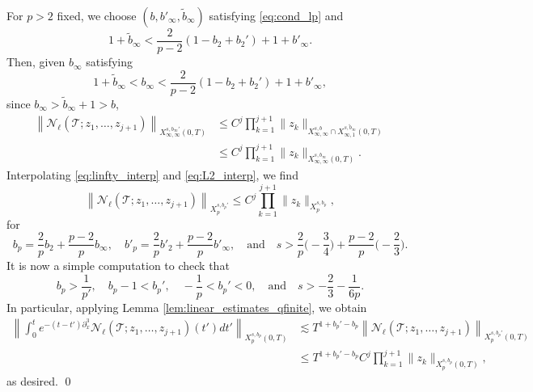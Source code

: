 \documentclass[a4paper,
11pt,  reqno]{amsart}
\newcommand{\5}{\textup{V}}
\newcommand{\wt}{\widetilde}
\newcommand{\dx}{\partial_x}
\theoremstyle{remark}
\newcommand{\TT}{\mathcal{T}}
\renewcommand{\l}{\ell}
\numberwithin{equation}{section}
\numberwithin{theorem}{section}
\newcommand{\Ncal}{\mathcal{N}}
\begin{document}
For $p>2$ fixed, we choose $(b, b'_\infty, \wt{b}_\infty)$ satisfying \eqref{eq:cond_lp} and
\begin{equation}
    1+\wt{b}_\infty <\frac{2}{p-2}(1-b_2+b_2') + 1 + b'_\infty.
\end{equation}
Then, given $b_\infty$ satisfying
\begin{equation}
    1+\wt{b}_\infty<b_\infty <\frac{2}{p-2}(1-b_2+b_2') + 1 + b'_\infty,
\end{equation}
since $b_\infty>\wt{b}_\infty+1>b$,
\begin{align}
    \left\| \Ncal_\l(\TT; z_1,\dots, z_{j+1})\right\|_{X^{s,b_\infty'}_{\infty, \infty}(0,T)} &\le  C^j\prod_{k=1}^{j+1}\|z_k\|_{X^{s,b}_{\infty, \infty}\cap X^{s,\wt{b}_\infty}_{\infty,1}(0,T)}\\&\le  C^j\prod_{k=1}^{j+1}\|z_k\|_{X^{s,b_\infty}_{\infty, \infty}(0,T)}.\label{eq:linfty_interp}
\end{align}
Interpolating \eqref{eq:linfty_interp} and \eqref{eq:L2_interp}, we find
\begin{equation}\label{eq:Lp_interp}
		\left\| \Ncal_\l(\TT; z_1,\dots, z_{j+1})\right\|_{X^{s,b_p'}_{p}}  \le  C^j\prod_{k=1}^{j+1}\|z_k\|_{X^{s,b_p}_{p}},
\end{equation}
for
$$
b_p=\frac{2}{p}b_2+\frac{p-2}{p}b_\infty,
\quad 
b'_p=\frac{2}{p}b'_2+\frac{p-2}{p}b'_\infty, 
\quad 
\text{and}
\quad 
s> \frac2p \Big(-\frac34\Big) + \frac{p-2}{p} \Big(-\frac23\Big)
.
$$
It is now a simple computation to check that
$$
b_p>\frac1{p'},
\quad b_p-1<b_p',
\quad 
-\frac{1}{p}<b_p'<0,
\quad 
\text{and}
\quad 
s> -\frac23 - \frac{1}{6p}.
$$
In particular, applying Lemma \ref{lem:linear_estimates_qfinite}, we obtain
	\begin{align}
		\left\|\int_0^t e^{-(t-t')\dx^3} \Ncal_\l(\TT; z_1,\dots, z_{j+1})(t') dt'  \right\|_{X^{s,b_p}_{p}(0,T)} 
        &	\lesssim T^{1+b_p'-b_p}\left\|\Ncal_\l(\TT; z_1,\dots, z_{j+1})  \right\|_{X^{s,b_p'}_{p} (0,T)} 
        \\
        &\le T^{1+b_p'-b_p} C^j\prod_{k=1}^{j+1}\|z_k\|_{X^{s,b_p}_{p}(0,T)},
	\end{align}
as desired. 
\qed
\end{document}
